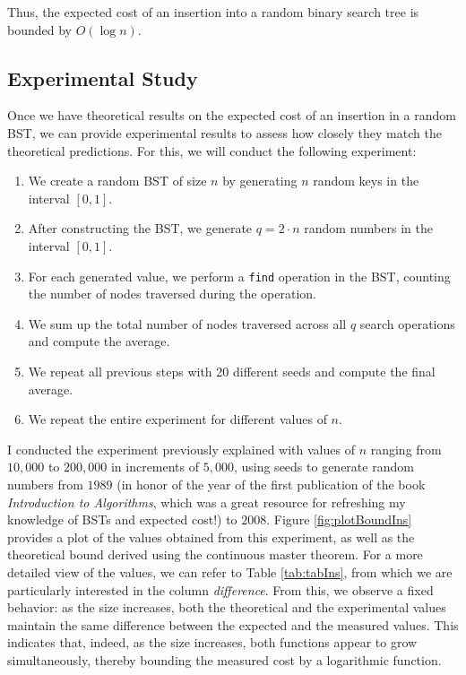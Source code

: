 Thus, the expected cost of an insertion into a random binary search tree is bounded by \( O(\log n) \).

\subsection{Experimental Study}
Once we have theoretical results on the expected cost of an insertion in a random BST, we can provide experimental results to assess how closely they match the theoretical predictions. For this, we will conduct the following experiment:

\begin{enumerate}
    \item We create a random BST of size \( n \) by generating \( n \) random keys in the interval \( [0,1] \).
    \item After constructing the BST, we generate \( q = 2\cdot n \) random numbers in the interval \( [0,1] \).
    \item For each generated value, we perform a \texttt{find} operation in the BST, counting the number of nodes traversed during the operation.
    \item We sum up the total number of nodes traversed across all \( q \) search operations and compute the average.
    \item We repeat all previous steps with 20 different seeds and compute the final average.
    \item We repeat the entire experiment for different values of \( n \).
\end{enumerate}

I conducted the experiment previously explained with values of \( n \) ranging from \( 10,000 \) to \( 200,000 \) in increments of \( 5,000 \), using seeds to generate random numbers from \( 1989 \) (in honor of the year of the first publication of the book \textit{Introduction to Algorithms}, which was a great resource for refreshing my knowledge of BSTs and expected cost!) to \( 2008 \). Figure \ref{fig:plotBoundIns} provides a plot of the values obtained from this experiment, as well as the theoretical bound derived using the continuous master theorem. For a more detailed view of the values, we can refer to Table \ref{tab:tabIns}, from which we are particularly interested in the column \textit{difference}. From this, we observe a fixed behavior: as the size increases, both the theoretical and the experimental values maintain the same difference between the expected and the measured values. This indicates that, indeed, as the size increases, both functions appear to grow simultaneously, thereby bounding the measured cost by a logarithmic function.

